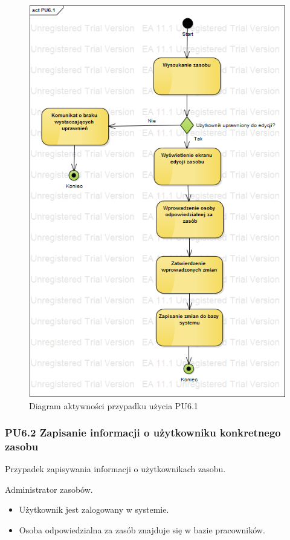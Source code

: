 \begin{figure}[h!]
	\centering
	\includegraphics[scale=0.6]{img/diagrams/activityDiagrams/PU61}
	\caption{Diagram aktywności przypadku użycia PU6.1 \label{fig:labelADPU6.1}}
\end{figure}

\subsubsection{PU6.2 Zapisanie informacji o użytkowniku konkretnego zasobu}
Przypadek zapisywania informacji o użytkownikach zasobu.

Administrator zasobów.

\begin{itemize}
\item Użytkownik jest zalogowany w systemie.
\item Osoba odpowiedzialna za zasób znajduje się w bazie pracowników.
\end{itemize}

